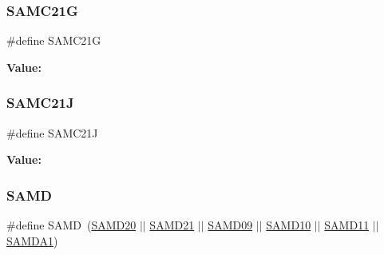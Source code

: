 \subsubsection{\texorpdfstring{SAMC21G}{SAMC21G}}
{\footnotesize\ttfamily \#define S\+A\+M\+C21G}

{\bfseries Value\+:}
\begin{DoxyCode}{0}
\DoxyCodeLine{( \(\backslash\)}
\DoxyCodeLine{    )}

\end{DoxyCode}
\mbox{\label{group__sam__part__macros__group_gaaecc832b9662714c608e2a02449651d7}} 
\subsubsection{\texorpdfstring{SAMC21J}{SAMC21J}}
{\footnotesize\ttfamily \#define S\+A\+M\+C21J}

{\bfseries Value\+:}
\begin{DoxyCode}{0}
\DoxyCodeLine{( \(\backslash\)}
\DoxyCodeLine{    )}

\end{DoxyCode}
\mbox{\label{group__sam__part__macros__group_ga5eed5c828e076621e5274450cdc6c32b}} 
\subsubsection{\texorpdfstring{SAMD}{SAMD}}
{\footnotesize\ttfamily \#define S\+A\+MD~(\mbox{\hyperlink{group__sam__part__macros__group_gad9193543e761f5967353a0464dde1e61}{S\+A\+M\+D20}} $\vert$$\vert$ \mbox{\hyperlink{group__sam__part__macros__group_gab9217b15071242235d3014381d61dbf7}{S\+A\+M\+D21}} $\vert$$\vert$ \mbox{\hyperlink{group__sam__part__macros__group_gafca3f645579e1a67ce865408ecb5269f}{S\+A\+M\+D09}} $\vert$$\vert$ \mbox{\hyperlink{group__sam__part__macros__group_gac83f6794433f2c57bfc5c520fe3d67ce}{S\+A\+M\+D10}} $\vert$$\vert$ \mbox{\hyperlink{group__sam__part__macros__group_ga9e5edb5637174377186d92141e7f60d9}{S\+A\+M\+D11}} $\vert$$\vert$ \mbox{\hyperlink{group__sam__part__macros__group_ga072dd622eab25246a14ce4a97a3df2df}{S\+A\+M\+D\+A1}})}

